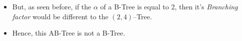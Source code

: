 \begin{frame}
\begin{columns}
\begin{column}{\textlecolumn}
\begin{block}{}
\begin{itemize}
                    \item But, as seen before, if the \(\alpha\) of a B-Tree is equal to 2, then it's 
                        \emph{Branching factor} would be different to the \(\left(2,4\right)\)--Tree.
                    \item Hence, this AB-Tree is not a B-Tree.
                \end{itemize}
            \end{block}
        \end{column}
        \begin{column}{\textricolumn}
        \end{column}
    \end{columns}
\end{frame}
